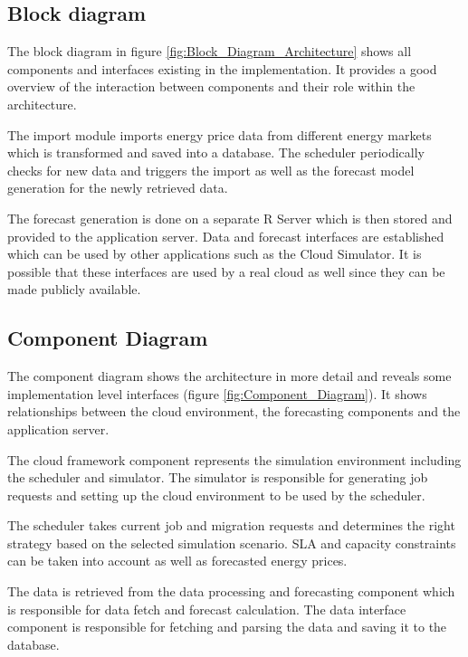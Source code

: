 \documentclass[paper=a4, fontsize=11pt]{scrartcl} %
\numberwithin{equation}{section} %
\numberwithin{figure}{section} %
\numberwithin{table}{section} %
\begin{document}

\subsection{Block diagram}

The block diagram in figure \ref{fig:Block_Diagram_Architecture} shows all components and interfaces existing in the implementation. It provides a good overview of the interaction between components and their role within the architecture. 

The import module imports energy price data from different energy markets which is transformed and saved into a database. The scheduler periodically checks for new data and triggers the import as well as the forecast model generation for the newly retrieved data. 

The forecast generation is done on a separate R Server which is then stored and provided to the application server. Data and forecast interfaces are established which can be used by other applications such as the Cloud Simulator. It is possible that these interfaces are used by a real cloud as well since they can be made publicly available. 


\subsection{Component Diagram}

The component diagram shows the architecture in more detail and reveals some implementation level interfaces (figure \ref{fig:Component_Diagram}). It shows relationships between the cloud environment, the forecasting components and the application server. 

The cloud framework component represents the simulation environment including the scheduler and simulator. The simulator is responsible for generating job requests and setting up the cloud environment to be used by the scheduler. 

The scheduler takes current job and migration requests and determines the right strategy based on the selected simulation scenario. SLA and capacity constraints can be taken into account as well as forecasted energy prices. 

The data is retrieved from the data processing and forecasting component which is responsible for data fetch and forecast calculation. The data interface component is responsible for fetching and parsing the data and saving it to the database. 
\end{document}
